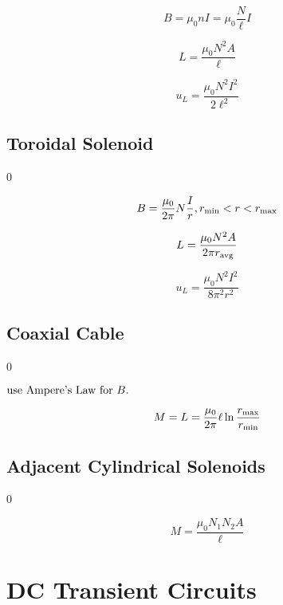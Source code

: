 \documentclass[12pt]{article}
\begin{document}
\begin{equation}
	B = \mu_0 n I = \mu_0 \dfrac N \ell I
\end{equation}

\begin{equation}
	L = \dfrac {\mu_0 N^2 A} \ell
\end{equation}

\begin{equation}
	u_L = \dfrac {\mu_0 N^2 I^2} {2 \ell^2}
\end{equation}

\subsection{Toroidal Solenoid} \setcounter {equation} 0

\begin{equation}
	B = \dfrac{\mu_0}{2 \pi} N \dfrac I r, r_{\rm min} < r < r_{\rm max}
\end{equation}

\begin{equation}
	L = \dfrac{\mu_0 N^2 A}{2 \pi r_{\rm avg}}
\end{equation}

\begin{equation}
	u_L = \dfrac{\mu_0 N^2 I^2}{8 \pi^2 r^2}
\end{equation}

\subsection{Coaxial Cable} \setcounter {equation} 0

$\hfill \text{use Ampere's Law for $B$.} \hfill$

\begin{equation}
	M = L = \dfrac {\mu_0} {2 \pi} \ell \ln \dfrac {r_{\rm max}} {r_{\rm min}}
\end{equation}

\subsection{Adjacent Cylindrical Solenoids} \setcounter {equation} 0

\begin{equation}
	M = \dfrac {\mu_0 N_1 N_2 A} \ell
\end{equation}

\newpage

\section{DC Transient Circuits}
\end{document}
